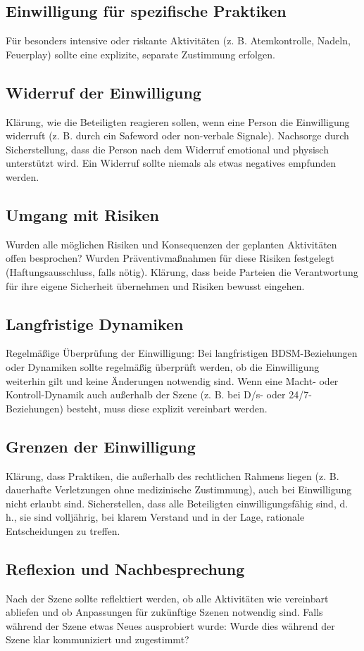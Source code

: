 \documentclass[a4paper,12pt]{article}
\begin{document}
 \subsection{Einwilligung für spezifische Praktiken}
 Für besonders intensive oder riskante Aktivitäten (z. B. Atemkontrolle, Nadeln, Feuerplay) sollte eine explizite, separate Zustimmung erfolgen.

\subsection{Widerruf der Einwilligung}
Klärung, wie die Beteiligten reagieren sollen, wenn eine Person die Einwilligung widerruft (z. B. durch ein Safeword oder non-verbale Signale). Nachsorge durch Sicherstellung, dass die Person nach dem Widerruf emotional und physisch unterstützt wird. Ein Widerruf sollte niemals als etwas negatives empfunden werden.

\subsection{Umgang mit Risiken}
Wurden alle möglichen Risiken und Konsequenzen der geplanten Aktivitäten offen besprochen? Wurden Präventivmaßnahmen für diese Risiken festgelegt (Haftungsausschluss, falls nötig). Klärung, dass beide Parteien die Verantwortung für ihre eigene Sicherheit übernehmen und Risiken bewusst eingehen.

\subsection{Langfristige Dynamiken}
Regelmäßige Überprüfung der Einwilligung: Bei langfristigen BDSM-Beziehungen oder Dynamiken sollte regelmäßig überprüft werden, ob die Einwilligung weiterhin gilt und keine Änderungen notwendig sind. Wenn eine Macht- oder Kontroll-Dynamik auch außerhalb der Szene (z. B. bei D/s- oder 24/7-Beziehungen) besteht, muss diese explizit vereinbart werden.

\subsection{Grenzen der Einwilligung}
Klärung, dass Praktiken, die außerhalb des rechtlichen Rahmens liegen (z. B. dauerhafte Verletzungen ohne medizinische Zustimmung), auch bei Einwilligung nicht erlaubt sind. Sicherstellen, dass alle Beteiligten einwilligungsfähig sind, d. h., sie sind volljährig, bei klarem Verstand und in der Lage, rationale Entscheidungen zu treffen.

\subsection{Reflexion und Nachbesprechung}
Nach der Szene sollte reflektiert werden, ob alle Aktivitäten wie vereinbart abliefen und ob Anpassungen für zukünftige Szenen notwendig sind. Falls während der Szene etwas Neues ausprobiert wurde: Wurde dies während der Szene klar kommuniziert und zugestimmt?
\end{document}
